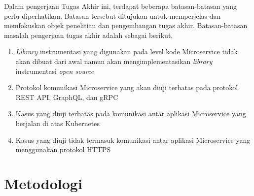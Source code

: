 Dalam pengerjaan Tugas Akhir ini, terdapat beberapa batasan-batasan yang perlu diperhatikan. Batasan tersebut ditujukan untuk memperjelas dan memfokuskan objek penelitian dan pengembangan tugas akhir. Batasan-batasan masalah pengerjaan tugas akhir adalah sebagai berikut,

\begin{enumerate}
	\item \textit{Library} instrumentasi yang digunakan pada level kode Microservice tidak akan dibuat dari awal namun akan mengimplementasikan \textit{library} instrumentasi \textit{open source}
	\item Protokol komunikasi Microservice yang akan diuji terbatas pada protokol REST API, GraphQL, dan gRPC
	\item Kasus yang diuji terbatas pada komunikasi antar aplikasi Microservice yang berjalan di atas Kubernetes
	\item Kasus yang diuji tidak termasuk komunikasi antar aplikasi Microservice yang menggunakan protokol HTTPS
\end{enumerate}

\section{Metodologi}

